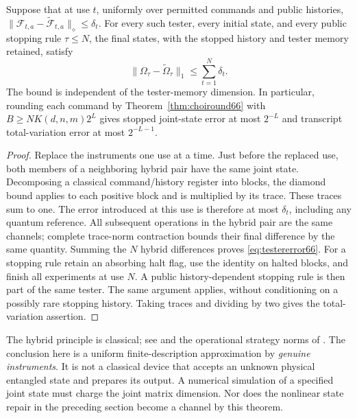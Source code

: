 \begin{theorem}\label{thm:adaptivediamond66}
Suppose that at use $t$, uniformly over permitted commands and public
histories,
$\|\mathcal F_{t,a}-\widetilde{\mathcal F}_{t,a}\|_\diamond\le\delta_t$.
For every such tester, every initial state, and every public stopping
rule $\tau\le N$, the final states, with the stopped history and tester
memory retained, satisfy
\begin{equation}\label{eq:testererror66}
 \|\Omega_\tau-\widetilde\Omega_\tau\|_1
                  \le\sum_{t=1}^N\delta_t.
\end{equation}
The bound is independent of the tester-memory dimension. In particular,
rounding each command by Theorem~\ref{thm:choiround66} with
$B\ge N K(d,n,m)2^L$ gives stopped joint-state error at most $2^{-L}$
and transcript total-variation error at most $2^{-L-1}$.
\end{theorem}
\begin{proof}
Replace the instruments one use at a time. Just before the replaced
use, both members of a neighboring hybrid pair have the same joint
state. Decomposing a classical command/history register into blocks,
the diamond bound applies to each positive block and is multiplied by
its trace. These traces sum to one. The error introduced at this use
is therefore at most $\delta_t$, including any quantum reference.
All subsequent operations in the hybrid pair are the same channels;
complete trace-norm contraction bounds their final difference by the
same quantity. Summing the $N$ hybrid differences proves
\eqref{eq:testererror66}. For a stopping rule retain an absorbing halt
flag, use the identity on halted blocks, and finish all experiments at
use $N$. A public history-dependent stopping rule is then part of the
same tester. The same argument applies, without conditioning on a
possibly rare stopping history. Taking traces and dividing by two
gives the total-variation assertion.
\end{proof}
The hybrid principle is classical; see
\cite[Section~3.3, equation~(3.306)]{Watrous65} and the operational
strategy norms of \cite{Gutoski66}. The conclusion here is a uniform
finite-description approximation by \emph{genuine instruments}. It is
not a classical device that accepts an unknown physical entangled
state and prepares its output. A numerical simulation of a specified
joint state must charge the joint matrix dimension. Nor does the
nonlinear state repair in the preceding section become a channel by
this theorem.

